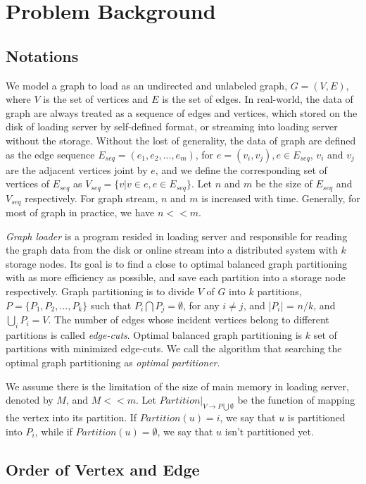 \documentclass{sig-alternate-2013}
\begin{document}
\section{Problem Background}\label{section-background}
\subsection{Notations}

We model a graph to load as an undirected and unlabeled graph,  $G=(V,E)$, where $V$ is the set of vertices and $E$ is the set of edges. In real-world, the data of graph are always treated as a sequence of edges and vertices, which stored on the disk of loading server by self-defined format, or streaming into loading server without the storage. Without the lost of generality, the data of graph are defined as the edge sequence $E_{seq}=(e_1,e_2,...,e_m)$, for $e=(v_i, v_j), e \in E_{seq}$, $v_i$ and $v_j$ are the adjacent vertices joint by $e$, and we define the corresponding set of vertices of $E_{seq}$ as $V_{seq} = \{v | v\in e , e\in E_{seq}\}$. Let $n$ and $m$ be the size of $E_{seq}$ and $V_{seq}$ respectively. For graph stream, $n$ and $m$ is increased with time. Generally, for most of graph in practice, we have $n<<m$.

\textit{Graph loader} is a program resided in loading server and responsible for reading the graph data from the disk or online stream into a distributed system with $k$ storage nodes. Its goal is to find a close to optimal balanced graph partitioning with as more efficiency as possible, and save each partition into a storage node respectively. Graph partitioning is to divide $V$ of $G$ into $k$ partitions, $P=\{P_1, P_2, ... , P_k\}$ such that $P_i \bigcap P_j = \emptyset$, for any $i\neq j$, and |$P_i$| = $n/k$, and ${\bigcup}_i P_i = V$. The number of edges whose incident vertices belong to different partitions is called \textit{edge-cuts}. Optimal balanced graph partitioning is $k$ set of partitions with minimized edge-cuts. We call the algorithm that searching the optimal graph partitioning as \textit{optimal partitioner}.


We assume there is the limitation of the size of main memory in loading server, denoted by $M$, and $M<<m$.
Let $Partition |_{V\rightarrow P\bigcup \emptyset}$ be the function of mapping the vertex into its partition. If $Partition(u)=i$, we say that $u$ is partitioned into $P_i$, while if $Partition(u)=\emptyset$, we say that $u$ isn't partitioned yet.


\subsection{Order of Vertex and Edge}\label{section-edge-order}
\end{document}
